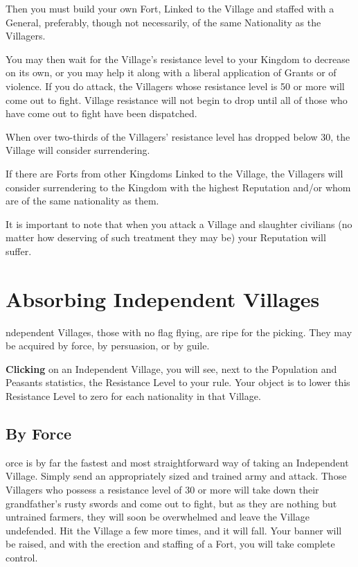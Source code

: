 Then you must build your own Fort, Linked to the Village and staffed with a General, preferably, though not necessarily, of the same Nationality as the Villagers.

You may then wait for the Village’s resistance level to your Kingdom to decrease on its own, or you may help it along with a liberal application of Grants or of violence. If you do attack, the Villagers whose resistance level is 50 or more will come out to fight. Village resistance will not begin to drop until all of those who have come out to fight have been dispatched.

When over two-thirds of the Villagers’ resistance level has dropped below 30, the Village will consider surrendering.

If there are Forts from other Kingdoms Linked to the Village, the Villagers will consider surrendering to the Kingdom with the highest Reputation and/or whom are of the same nationality as them.

It is important to note that when you attack a Village and slaughter civilians (no matter how deserving of such treatment they may be) your Reputation will suffer.

\section{Absorbing Independent Villages}

ndependent Villages, those with no flag flying, are ripe for the picking. They may be acquired by force, by persuasion, or by guile.

\textbf{Clicking} on an Independent Village, you will see, next to the Population and Peasants statistics, the Resistance Level to your rule. Your object is to lower this Resistance Level to zero for each nationality in that Village.

\subsection{By Force}


orce is by far the fastest and most straightforward way of taking an Independent Village. Simply send an appropriately sized and trained army and attack. Those Villagers who possess a resistance level of 30 or more will take down their grandfather’s rusty swords and come out to fight, but as they are nothing but untrained farmers, they will soon be overwhelmed and leave the Village undefended. Hit the Village a few more times, and it will fall. Your banner will be raised, and with the erection and staffing of a Fort, you will take complete control.

